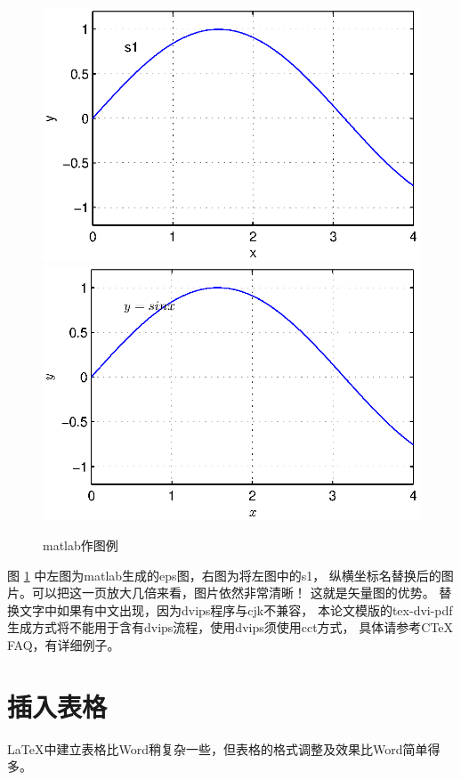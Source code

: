 \begin{figure}
\centering
\includegraphics[scale=0.6]{./Pictures/matlabfig.eps}
\includegraphics[scale=0.6]{./Pictures/matlabfigchg.eps}
\caption{matlab作图例}
\label{Figmatlab}
\end{figure}

图 \ref{Figmatlab} 中左图为matlab生成的eps图，右图为将左图中的s1，
纵横坐标名替换后的图片。可以把这一页放大几倍来看，图片依然非常清晰！
这就是矢量图的优势。
替换文字中如果有中文出现，因为dvips程序与cjk不兼容，
本论文模版的tex-dvi-pdf生成方式将不能用于含有dvips流程，使用dvips须使用cct方式，
具体请参考CTeX FAQ，有详细例子。

\section{插入表格}

\LaTeX 中建立表格比Word稍复杂一些，但表格的格式调整及效果比Word简单得多。

